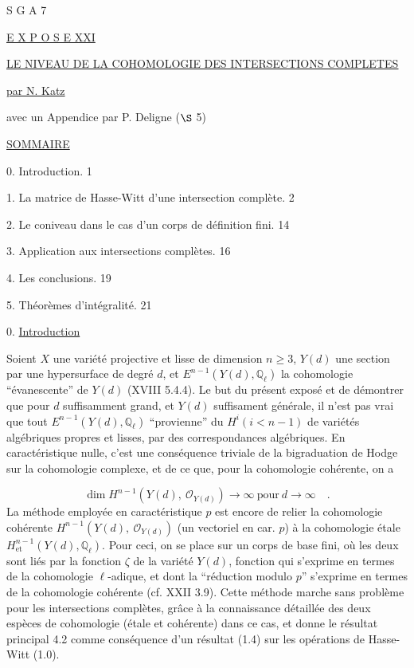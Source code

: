 


S G A  7


\underline{E X P O S E  XXI}


\underline{\underline{LE NIVEAU DE LA COHOMOLOGIE DES INTERSECTIONS COMPLETES}}

\underline{par N. Katz}

avec un Appendice \quad par P. Deligne ($\S$ 5)


\underline{SOMMAIRE}

0.  Introduction. \hfill 1

1.  La matrice de Hasse-Witt d'une intersection complète. \hfill 2

2.  Le coniveau dans le cas d'un corps de définition fini. \hfill 14

3.  Application aux intersections complètes. \hfill 16

4.  Les conclusions. \hfill 19

5.  Théorèmes d'intégralité. \hfill 21




0. \underline{Introduction}

Soient $X$ une variété projective et lisse de dimension $n \geq 3$, $Y(d)$ une section par une hypersurface de degré $d$, et $E^{n-1}(Y(d),\mathbb{Q}_\ell)$ la cohomologie ``évanescente'' de $Y(d)$ (XVIII 5.4.4). Le but du présent exposé et de démontrer que pour $d$ suffisamment grand, et $Y(d)$ suffisament générale, il n'est pas vrai que tout $E^{n-1}(Y(d),\mathbb{Q}_\ell)$ ``provienne'' du $H^i(i < n-1)$ de variétés algébriques propres et lisses, par des correspondances algébriques. En caractéristique nulle, c'est une conséquence triviale de la bigraduation de Hodge sur la cohomologie complexe, et de ce que, pour la cohomologie cohérente, on a

\begin{equation*}
\dim H^{n-1}(Y(d),\ \mathcal{O}_{Y(d)}) \longrightarrow \infty \ \mbox{pour} \ d \longrightarrow \infty \quad .
\end{equation*}
La méthode employée en caractéristique $p$ est encore de relier la cohomologie cohérente $H^{n-1}(Y(d),\ \mathcal{O}_{Y(d)})$ (un vectoriel en car. $p$) à la cohomologie étale $H^{n-1}_{\mathrm{et}}(Y(d),\mathbb{Q}_\ell)$. Pour ceci, on se place sur un corps
de base fini, où les deux sont liés par la fonction $\zeta$ de la variété $Y(d)$, fonction qui s'exprime en termes de la cohomologie $\ell$-adique, et dont la ``réduction modulo $p$'' s'exprime en termes de la cohomologie cohérente (cf. XXII 3.9). Cette méthode marche sans problème pour les intersections complètes, grâce à la connaissance détaillée des deux espèces de cohomologie (étale et cohérente) dans ce cas, et donne le résultat principal 4.2 comme conséquence d'un résultat (1.4) sur les opérations de Hasse-Witt (1.0).

